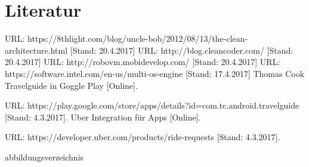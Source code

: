 \documentclass[a4paper,10pt,xetex]{article}
\begin{document}














\appendix

\section{Literatur}
\begingroup
\renewcommand{\section}[2]{}%
\begin{thebibliography}{9}
   URL: https://8thlight.com/blog/uncle-bob/2012/08/13/the-clean-architecture.html [Stand: 20.4.2017]
   URL: http://blog.cleancoder.com/ [Stand: 20.4.2017]
   URL: http://robovm.mobidevelop.com/ [Stand: 20.4.2017]
   URL: https://software.intel.com/en-us/multi-os-engine [Stand: 17.4.2017]
    Thomas Cook Travelguide in Goggle Play [Online].

    URL: https://play.google.com/store/apps/details?id=com.tc.android.travelguide [Stand: 4.3.2017].
    Uber Integration für Apps [Online].

    URL: https://developer.uber.com/products/ride-requests [Stand: 4.3.2017].
\end{thebibliography}
\endgroup

\section{Abbildungsverzeichnis}\label{abbildungsverzeichnis}
\begingroup
\renewcommand{\section}[2]{}%
\hypersetup{linkcolor=black}
\listoffigures
\endgroup

\newpage
\end{document}
